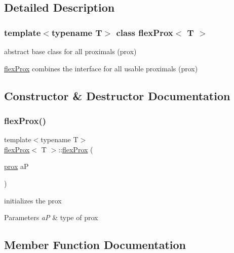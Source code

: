 \subsection{Detailed Description}
\subsubsection*{template$<$typename T$>$\newline
class flex\+Prox$<$ T $>$}

abstract base class for all proximals (prox) 

\hyperlink{classflex_prox}{flex\+Prox} combines the interface for all usable proximals (prox) 

\subsection{Constructor \& Destructor Documentation}
\mbox{\label{classflex_prox_a6055dee6acc0a2eedebf11c6ee4b644b}} 
\subsubsection{\texorpdfstring{flex\+Prox()}{flexProx()}}
{\footnotesize\ttfamily template$<$typename T$>$ \\
\hyperlink{classflex_prox}{flex\+Prox}$<$ T $>$\+::\hyperlink{classflex_prox}{flex\+Prox} (\begin{DoxyParamCaption}\item[{\hyperlink{tools_8h_aa34fd4f0962337a24e898ac0abdfff22}{prox}}]{aP }\end{DoxyParamCaption})\hspace{0.3cm}{\ttfamily [inline]}}



initializes the prox 


\begin{DoxyParams}{Parameters}
{\em aP} & type of prox \\
\hline
\end{DoxyParams}


\subsection{Member Function Documentation}
\mbox{\label{classflex_prox_a6d3119bd368c4216ad264a1f6dc1d01f}} 
